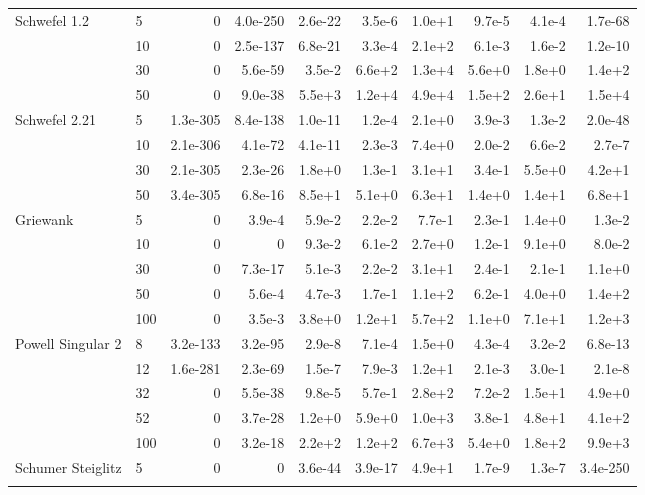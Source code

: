 {\begin{longtable}{llrrrrrrrr}
\midrule
\multirow{4}{*}{Schwefel 1.2} & 5 & 0 & 4.0e{-}250 & 2.6e{-}22 & 3.5e{-}6 & 1.0e{+}1 & 9.7e{-}5 & 4.1e{-}4 & 1.7e{-}68 \\*
 & 10 & 0 & 2.5e{-}137 & 6.8e{-}21 & 3.3e{-}4 & 2.1e{+}2 & 6.1e{-}3 & 1.6e{-}2 & 1.2e{-}10 \\*
 & 30 & 0 & 5.6e{-}59 & 3.5e{-}2 & 6.6e{+}2 & 1.3e{+}4 & 5.6e{+}0 & 1.8e{+}0 & 1.4e{+}2 \\*
 & 50 & 0 & 9.0e{-}38 & 5.5e{+}3 & 1.2e{+}4 & 4.9e{+}4 & 1.5e{+}2 & 2.6e{+}1 & 1.5e{+}4 \\
\midrule
\multirow{4}{*}{Schwefel 2.21} & 5 & 1.3e{-}305 & 8.4e{-}138 & 1.0e{-}11 & 1.2e{-}4 & 2.1e{+}0 & 3.9e{-}3 & 1.3e{-}2 & 2.0e{-}48 \\*
 & 10 & 2.1e{-}306 & 4.1e{-}72 & 4.1e{-}11 & 2.3e{-}3 & 7.4e{+}0 & 2.0e{-}2 & 6.6e{-}2 & 2.7e{-}7 \\*
 & 30 & 2.1e{-}305 & 2.3e{-}26 & 1.8e{+}0 & 1.3e{-}1 & 3.1e{+}1 & 3.4e{-}1 & 5.5e{+}0 & 4.2e{+}1 \\*
 & 50 & 3.4e{-}305 & 6.8e{-}16 & 8.5e{+}1 & 5.1e{+}0 & 6.3e{+}1 & 1.4e{+}0 & 1.4e{+}1 & 6.8e{+}1 \\
\midrule
\multirow{5}{*}{Griewank} & 5 & 0 & 3.9e{-}4 & 5.9e{-}2 & 2.2e{-}2 & 7.7e{-}1 & 2.3e{-}1 & 1.4e{+}0 & 1.3e{-}2 \\*
 & 10 & 0 & 0 & 9.3e{-}2 & 6.1e{-}2 & 2.7e{+}0 & 1.2e{-}1 & 9.1e{+}0 & 8.0e{-}2 \\*
 & 30 & 0 & 7.3e{-}17 & 5.1e{-}3 & 2.2e{-}2 & 3.1e{+}1 & 2.4e{-}1 & 2.1e{-}1 & 1.1e{+}0 \\*
 & 50 & 0 & 5.6e{-}4 & 4.7e{-}3 & 1.7e{-}1 & 1.1e{+}2 & 6.2e{-}1 & 4.0e{+}0 & 1.4e{+}2 \\*
 & 100 & 0 & 3.5e{-}3 & 3.8e{+}0 & 1.2e{+}1 & 5.7e{+}2 & 1.1e{+}0 & 7.1e{+}1 & 1.2e{+}3 \\
\midrule
\multirow{5}{*}{Powell Singular 2} & 8 & 3.2e{-}133 & 3.2e{-}95 & 2.9e{-}8 & 7.1e{-}4 & 1.5e{+}0 & 4.3e{-}4 & 3.2e{-}2 & 6.8e{-}13 \\*
 & 12 & 1.6e{-}281 & 2.3e{-}69 & 1.5e{-}7 & 7.9e{-}3 & 1.2e{+}1 & 2.1e{-}3 & 3.0e{-}1 & 2.1e{-}8 \\*
 & 32 & 0 & 5.5e{-}38 & 9.8e{-}5 & 5.7e{-}1 & 2.8e{+}2 & 7.2e{-}2 & 1.5e{+}1 & 4.9e{+}0 \\*
 & 52 & 0 & 3.7e{-}28 & 1.2e{+}0 & 5.9e{+}0 & 1.0e{+}3 & 3.8e{-}1 & 4.8e{+}1 & 4.1e{+}2 \\*
 & 100 & 0 & 3.2e{-}18 & 2.2e{+}2 & 1.2e{+}2 & 6.7e{+}3 & 5.4e{+}0 & 1.8e{+}2 & 9.9e{+}3 \\
\midrule
\multirow{5}{*}{Schumer Steiglitz} & 5 & 0 & 0 & 3.6e{-}44 & 3.9e{-}17 & 4.9e{+}1 & 1.7e{-}9 & 1.3e{-}7 & 3.4e{-}250 \\*

\end{longtable}}
